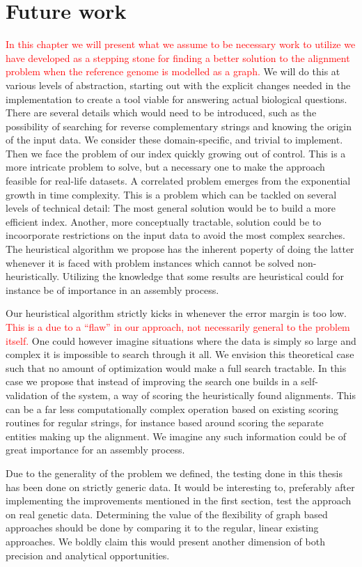 \documentclass[thesis.tex]{subfiles}
\begin{document}
\chapter{Future work}
\label{sec:future_work}
\textcolor{red}{In this chapter we will present what we assume to be necessary work to utilize we have developed as a stepping stone for finding a better solution to the alignment problem when the reference genome is modelled as a graph.} We will do this at various levels of abstraction, starting out with the explicit changes needed in the implementation to create a tool viable for answering actual biological questions. There are several details which would need to be introduced, such as the possibility of searching for reverse complementary strings and knowing the origin of the input data. We consider these domain-specific, and trivial to implement. Then we face the problem of our index quickly growing out of control. This is a more intricate problem to solve, but a necessary one to make the approach feasible for real-life datasets. A correlated problem emerges from the exponential growth in time complexity. This is a problem which can be tackled on several levels of technical detail: The most general solution would be to build a more efficient index. Another, more conceptually tractable, solution could be to incoorporate restrictions on the input data to avoid the most complex searches. The heuristical algorithm we propose has the inherent poperty of doing the latter whenever it is faced with problem instances which cannot be solved non-heuristically. Utilizing the knowledge that some results are heuristical could for instance be of importance in an assembly process.\\
\par\noindent
Our heuristical algorithm strictly kicks in whenever the error margin is too low. \textcolor{red}{This is a due to a ``flaw'' in our approach, not necessarily general to the problem itself.} One could however imagine situations where the data is simply so large and complex it is impossible to search through it all. We envision this theoretical case such that no amount of optimization would make a full search tractable. In this case we propose that instead of improving the search one builds in a self-validation of the system, a way of scoring the heuristically found alignments. This can be a far less computationally complex operation based on existing scoring routines for regular strings, for instance based around scoring the separate entities making up the alignment. We imagine any such information could be of great importance for an assembly process.\\
\par\noindent
Due to the generality of the problem we defined, the testing done in this thesis has been done on strictly generic data. It would be interesting to, preferably after implementing the improvements mentioned in the first section, test the approach on real genetic data. Determining the value of the flexibility of graph based approaches should be done by comparing it to the regular, linear existing approaches. We boldly claim this would present another dimension of both precision and analytical opportunities.
\end{document}
